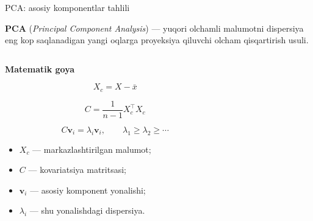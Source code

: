 \documentclass[aspectratio=169,11pt]{beamer}
\begin{document}
\begin{frame}{PCA: asosiy komponentlar tahlili}
\footnotesize

\begin{tcolorbox}[defbox,left=2mm,right=2mm,top=1mm,bottom=1mm]
\textbf{PCA} (\textit{Principal Component Analysis}) — yuqori o\textquotesingle{}lchamli
ma\textquotesingle{}lumotni dispersiya eng ko\textquotesingle{}p saqlanadigan yangi
o\textquotesingle{}qlarga proyeksiya qiluvchi o\textquotesingle{}lcham qisqartirish usuli.
\end{tcolorbox}

\vspace{3pt}

\begin{columns}[T,totalwidth=\textwidth]
\begin{column}{0.52\textwidth}

\textbf{Matematik g\textquotesingle{}oya}

\[
X_c = X-\bar{x}
\]

\[
C=\frac{1}{n-1}X_c^{\top}X_c
\]

\[
C\mathbf{v}_i=\lambda_i\mathbf{v}_i,
\qquad
\lambda_1\geq\lambda_2\geq\cdots
\]

\begin{itemize}\setlength\itemsep{3pt}
  \item $X_c$ — markazlashtirilgan ma\textquotesingle{}lumot;
  \item $C$ — kovariatsiya matritsasi;
  \item $\mathbf{v}_i$ — asosiy komponent yo\textquotesingle{}nalishi;
  \item $\lambda_i$ — shu yo\textquotesingle{}nalishdagi dispersiya.
\end{itemize}

\end{column}

\begin{column}{0.44\textwidth}
\centering

\end{column}
\end{columns}
\end{frame}
\end{document}
